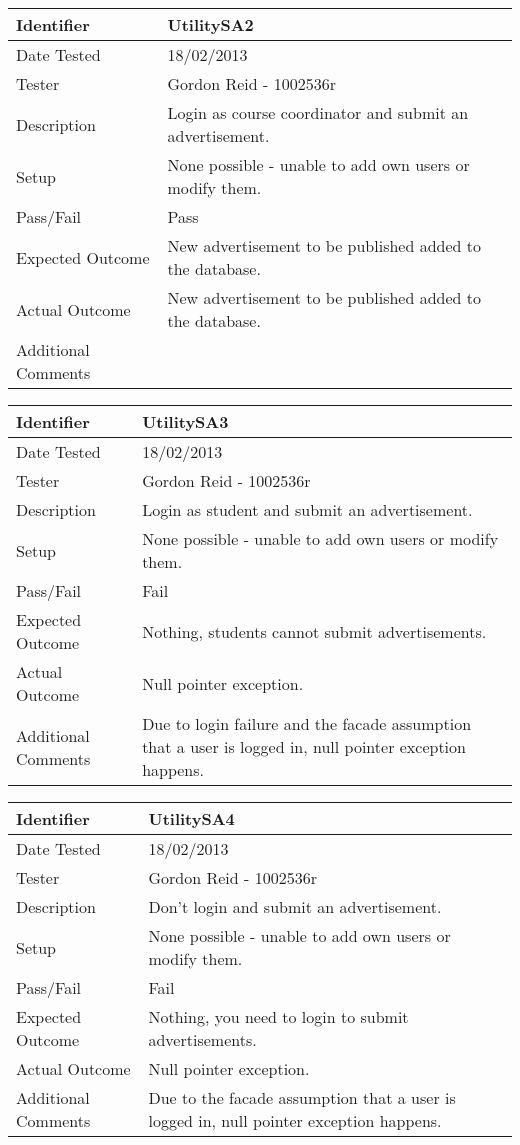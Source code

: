 \begin{tabularx}{\textwidth}{|T|L|}
\hline
Identifier & UtilitySA2\\
\hline
Date Tested & 18/02/2013\\
\hline
Tester & Gordon Reid - 1002536r\\
\hline
Description & Login as course coordinator and submit an advertisement.\\
\hline
Setup & None possible - unable to add own users or modify them.\\
\hline
Pass/Fail & Pass\\
\hline
Expected Outcome & New advertisement to be published added to the database.\\
\hline
Actual Outcome & New advertisement to be published added to the database.\\
\hline
Additional Comments &\\
\hline
\end{tabularx}

\vspace{2em}

\begin{tabularx}{\textwidth}{|T|L|}
\hline
Identifier & UtilitySA3\\
\hline
Date Tested & 18/02/2013\\
\hline
Tester & Gordon Reid - 1002536r\\
\hline
Description & Login as student and submit an advertisement.\\
\hline
Setup & None possible - unable to add own users or modify them.\\
\hline
Pass/Fail & Fail\\
\hline
Expected Outcome & Nothing, students cannot submit advertisements.\\
\hline
Actual Outcome & Null pointer exception.\\
\hline
Additional Comments & Due to login failure and the facade assumption that a user 
is logged in, null pointer exception happens.\\
\hline
\end{tabularx}

\vspace{2em}

\begin{tabularx}{\textwidth}{|T|L|}
\hline
Identifier & UtilitySA4\\
\hline
Date Tested & 18/02/2013\\
\hline
Tester & Gordon Reid - 1002536r\\
\hline
Description & Don't login and submit an advertisement.\\
\hline
Setup & None possible - unable to add own users or modify them.\\
\hline
Pass/Fail & Fail\\
\hline
Expected Outcome & Nothing, you need to login to submit advertisements.\\
\hline
Actual Outcome & Null pointer exception.\\
\hline
Additional Comments & Due to the facade assumption that a user 
is logged in, null pointer exception happens.\\
\hline
\end{tabularx}

